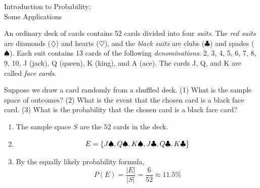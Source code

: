 \documentclass[10pt]{beamer}
\begin{document}
\begin{frame}[standout]
Introduction to Probability: \\
Some Applications
\end{frame}


\begin{frame}
\footnotesize 
\begin{myredbox}[title=Background on cards]
An ordinary deck of cards contains 52 cards divided into four \textit{suits}.  The \textit{red suits} are 	diamonds ($\diamondsuit$) and hearts ($\heartsuit$), and the \textit{black suits} are clubs ($\clubsuit$) and spades ($\spadesuit$).  Each suit contains 13 cards of the following \textit{denominations}: 2, 3, 4, 5, 6, 7, 8, 9, 10, J (jack), Q (queen), K (king), and A (ace).  The cards J, Q, and K are called \textit{face cards}. 	
\end{myredbox}
\vfill 
\begin{myyellowbox}[title=Poll]
 Suppose we draw a card randomly from a shuffled deck.  (1)  What is the sample space of outcomes? (2) What is the event that the chosen card is a black face card. (3) What is the probability that the chosen card is a black face card?
\end{myyellowbox}
\pause 
\begin{mygreenbox}[title=Solution]
\begin{enumerate}
	\item The sample space $S$ are the 52 cards in the deck.
	\item \pause 
	\[E = \{ { J \spadesuit, Q \spadesuit, K \spadesuit, J \clubsuit, Q \clubsuit, K \clubsuit} \} \] 
	\item \pause  By the equally likely probability formula,
	\[ P(E) = \frac{|E|}{|S|} = \frac{6}{52} \approx 11.5\%\]
\end{enumerate}
\end{mygreenbox}


\end{frame}
\end{document}
